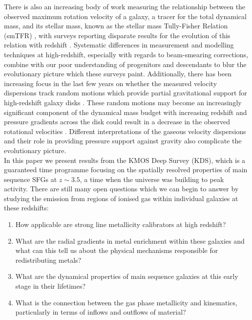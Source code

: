 \documentclass[fleqn,usenatbib]{mn2e}
\begin{document}
There is also an increasing body of work measuring the relationship between the observed maximum rotation velocity of a galaxy, a tracer for the total dynamical mass, and its stellar mass, known as the stellar mass Tully-Fisher Relation (smTFR) \citep{Tully1977}, with surveys reporting disparate results for the evolution of this relation with redshift \citep[e.g.][]{Puech2008,Miller2011,Gnerucci2011,Swinbank2012,Simons2016,Tiley2016a,Harrison2017,Straatman2017,Ubler2017}.
Systematic differences in measurement and modelling techniques at high-redshift, especially with regards to beam-smearing corrections, combine with our poor understanding of progenitors and descendants to blur the evolutionary picture which these surveys paint.
Additionally, there has been increasing focus in the last few years on whether the measured velocity dispersions track random motions which provide partial gravitational support for high-redshift galaxy disks \citep[e.g.][]{Burkert2010,Wuyts2016b,Ubler2017,Genzel2017,Lang2017}.
These random motions may become an increasingly significant component of the dynamical mass budget with increasing redshift \citep{Wuyts2016b} and pressure gradients across the disk could result in a decrease in the observed rotational velocities \citep{Burkert2010}. 
Different interpretations of the gaseous velocity dispersions and their role in providing pressure support against gravity also complicate the evolutionary picture. \\

In this paper we present results from the KMOS Deep Survey (KDS), which is a guaranteed time programme focusing on the spatially resolved properties of main sequence SFGs at $z\sim3.5$, a time when the universe was building to peak activity.
There are still many open questions which we can begin to answer by studying the emission from regions of ionised gas within individual galaxies at these redshifts: \begin{enumerate}[label=(\roman*)] \item How applicable are strong line metallicity calibrators at high redshift? \item  What are the radial gradients in metal enrichment within these galaxies and what can this tell us about the physical mechanisms responsible for redistributing metals?
\item What are the dynamical properties of main sequence galaxies at this early stage in their lifetimes? 
\item What is the connection between the gas phase metallicity and  kinematics, particularly in terms of inflows and outflows of material? \end{enumerate}
\end{document}
